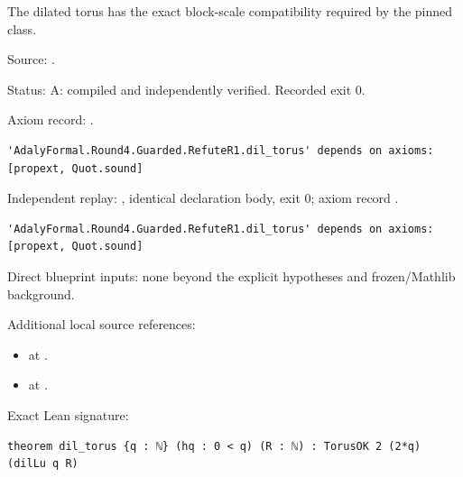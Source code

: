 \begin{theorem}[bp-028]
\label{bp-028}
\uses{}
\leanok
The dilated torus has the exact block-scale compatibility required by the pinned class.

\par Source: \texttt{}.
\par Status: A: compiled and independently verified. Recorded exit 0.
\par Axiom record: \texttt{}.
\begin{verbatim}
'AdalyFormal.Round4.Guarded.RefuteR1.dil_torus' depends on axioms: [propext, Quot.sound]
\end{verbatim}
\par Independent replay: \texttt{}, identical declaration body, exit 0; axiom record \texttt{}.
\begin{verbatim}
'AdalyFormal.Round4.Guarded.RefuteR1.dil_torus' depends on axioms: [propext, Quot.sound]
\end{verbatim}
\par Direct blueprint inputs: none beyond the explicit hypotheses and frozen/Mathlib background.
\par Additional local source references:
\begin{itemize}
\item \texttt{} at \texttt{}.
\item \texttt{} at \texttt{}.
\end{itemize}
\par Exact Lean signature:
\begin{verbatim}
theorem dil_torus {q : ℕ} (hq : 0 < q) (R : ℕ) : TorusOK 2 (2*q) (dilLu q R)
\end{verbatim}
\end{theorem}

